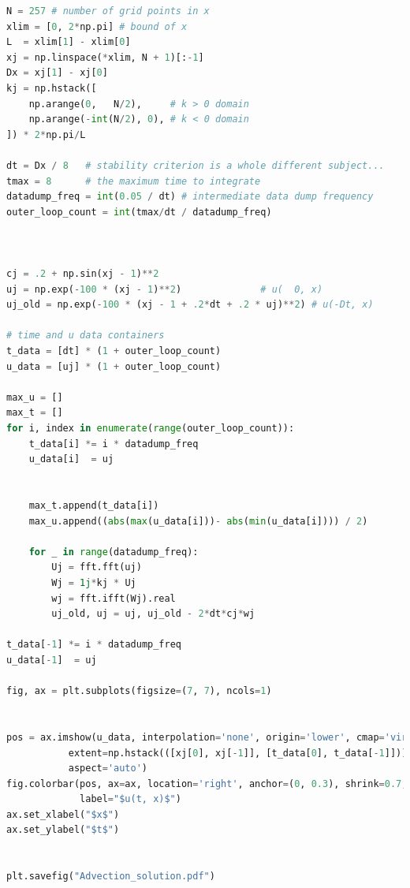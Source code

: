 \documentclass[11pt]{article}
\begin{document}
\begin{lstlisting}[language=Python]
N = 257 # number of grid points in x
xlim = [0, 2*np.pi] # bound of x
L  = xlim[1] - xlim[0]
xj = np.linspace(*xlim, N + 1)[:-1]
Dx = xj[1] - xj[0]
kj = np.hstack([
    np.arange(0,   N/2),     # k > 0 domain
    np.arange(-int(N/2), 0), # k < 0 domain
]) * 2*np.pi/L

dt = Dx / 8   # stability criterion is a whole different subject...
tmax = 8      # the maximum time to integrate
datadump_freq = int(0.05 / dt) # intermediate data dump frequency
outer_loop_count = int(tmax/dt / datadump_freq)



cj = .2 + np.sin(xj - 1)**2
uj = np.exp(-100 * (xj - 1)**2)              # u(  0, x)
uj_old = np.exp(-100 * (xj - 1 + .2*dt + .2 * uj)**2) # u(-Dt, x)

# time and u data containers
t_data = [dt] * (1 + outer_loop_count)
u_data = [uj] * (1 + outer_loop_count)

max_u = []
max_t = []
for i, index in enumerate(range(outer_loop_count)):
    t_data[i] *= i * datadump_freq
    u_data[i]  = uj
    

    max_t.append(t_data[i])
    max_u.append((abs(max(u_data[i]))- abs(min(u_data[i]))) / 2)
    
    for _ in range(datadump_freq):
        Uj = fft.fft(uj)
        Wj = 1j*kj * Uj
        wj = fft.ifft(Wj).real
        uj_old, uj = uj, uj_old - 2*dt*cj*wj

t_data[-1] *= i * datadump_freq
u_data[-1]  = uj

fig, ax = plt.subplots(figsize=(7, 7), ncols=1)


pos = ax.imshow(u_data, interpolation='none', origin='lower', cmap='viridis',
           extent=np.hstack(([xj[0], xj[-1]], [t_data[0], t_data[-1]])),
           aspect='auto')
fig.colorbar(pos, ax=ax, location='right', anchor=(0, 0.3), shrink=0.7,
             label="$u(t, x)$")
ax.set_xlabel("$x$")
ax.set_ylabel("$t$")


plt.savefig("Advection_solution.pdf")
\end{lstlisting}
\end{document}
